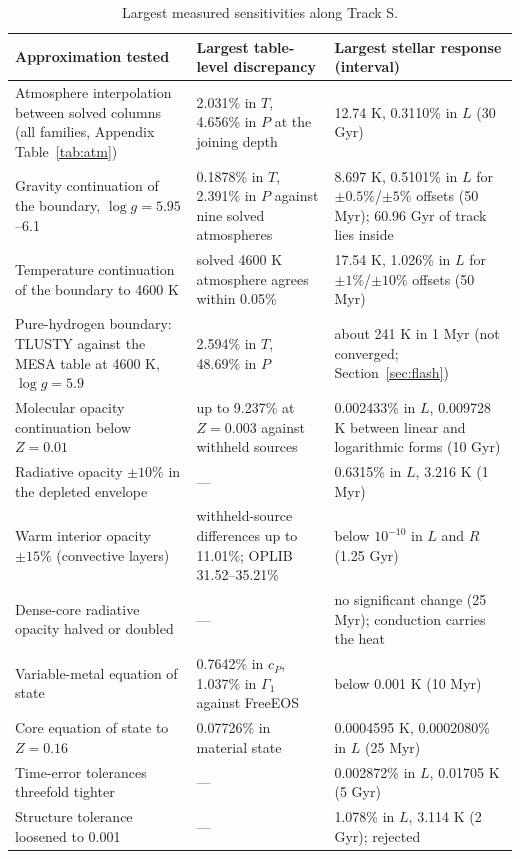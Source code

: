 \begin{table}[H]\centering\small
\caption{Largest measured sensitivities along Track S.}\label{tab:sensitivity}
\begin{tabular}{@{}p{}p{}p{}@{}}\toprule
Approximation tested & Largest table-level discrepancy & Largest stellar response (interval) \\\midrule
Atmosphere interpolation between solved columns (all families, Appendix Table~\ref{tab:atm}) & 2.031\% in $T$, 4.656\% in $P$ at the joining depth & 12.74 K, 0.3110\% in $L$ (30 Gyr) \\
Gravity continuation of the boundary, $\log g=5.95$--6.1 & 0.1878\% in $T$, 2.391\% in $P$ against nine solved atmospheres & 8.697 K, 0.5101\% in $L$ for $\pm0.5\%$/$\pm5\%$ offsets (50 Myr); 60.96 Gyr of track lies inside \\
Temperature continuation of the boundary to 4600 K & solved 4600 K atmosphere agrees within 0.05\% & 17.54 K, 1.026\% in $L$ for $\pm1\%$/$\pm10\%$ offsets (50 Myr) \\
Pure-hydrogen boundary: TLUSTY against the MESA table at 4600 K, $\log g=5.9$ & 2.594\% in $T$, 48.69\% in $P$ & about 241 K in 1 Myr (not converged; Section~\ref{sec:flash}) \\
Molecular opacity continuation below $Z=0.01$ & up to 9.237\% at $Z=0.003$ against withheld sources & 0.002433\% in $L$, 0.009728 K between linear and logarithmic forms (10 Gyr) \\
Radiative opacity $\pm10\%$ in the depleted envelope & --- & 0.6315\% in $L$, 3.216 K (1 Myr) \\
Warm interior opacity $\pm15\%$ (convective layers) & withheld-source differences up to 11.01\%; OPLIB 31.52--35.21\% & below $10^{-10}$ in $L$ and $R$ (1.25 Gyr) \\
Dense-core radiative opacity halved or doubled & --- & no significant change (25 Myr); conduction carries the heat \\
Variable-metal equation of state & 0.7642\% in $c_P$, 1.037\% in $\Gamma_1$ against FreeEOS & below 0.001 K (10 Myr) \\
Core equation of state to $Z=0.16$ & 0.07726\% in material state & 0.0004595 K, 0.0002080\% in $L$ (25 Myr) \\
Time-error tolerances threefold tighter & --- & 0.002872\% in $L$, 0.01705 K (5 Gyr) \\
Structure tolerance loosened to 0.001 & --- & 1.078\% in $L$, 3.114 K (2 Gyr); rejected \\\bottomrule
\end{tabular}
\end{table}
